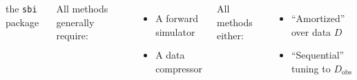 \documentclass[aspectratio=169]{beamer}
\begin{document}
\begin{frame}
\begin{columns}
\begin{block}{the \texttt{sbi} package}
            {\small {}}
        \end{block}
        All methods generally require:
        \begin{itemize}
            \item A forward simulator
            \item A data compressor
        \end{itemize}
        All methods either:
        \begin{itemize}
            \item ``Amortized'' over data $D$
            \item ``Sequential'' tuning to $D_\text{obs}$
        \end{itemize}
    \end{columns}
\end{frame}
\end{document}
